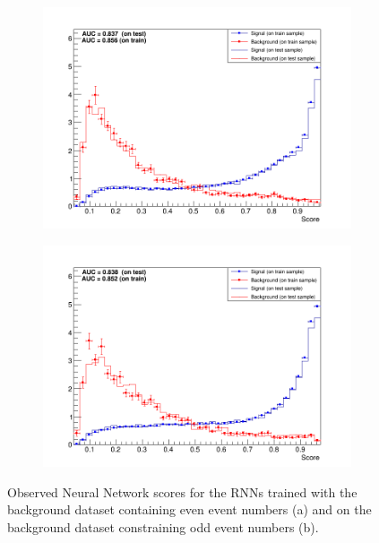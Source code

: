 \begin{figure}[H]
\begin{subfigure}{.5\textwidth}
  \centering
  \includegraphics[width=.99\linewidth]{figs/RNN/ScoreLSTMEven}
  \caption{}
  \label{fig:ScoreRNNEven}
\end{subfigure}%
\begin{subfigure}{.5\textwidth}
  \centering
  \includegraphics[width=.99\linewidth]{figs/RNN/ScoreLSTMOdd}
  \caption{}
  \label{fig:ScoreRNNOdd}
\end{subfigure}
\caption{Observed Neural Network scores for the RNNs trained with the background dataset containing even event numbers (a) and on the background dataset constraining odd event numbers (b).}
\label{fig:ScoresRNN}
\end{figure}


